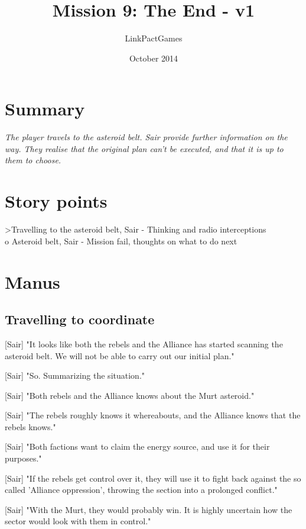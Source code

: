 \documentclass[a4paper,12pt]{article}
\begin{document}
\title{Mission 9: The End - v1}
\author{LinkPactGames}
\date{October 2014}
\maketitle

\section{Summary}

\textit{The player travels to the asteroid belt. Sair provide further information on the way.
They realise that the original plan can't be executed, and that it is up to them to choose.}

\section{Story points}

\textgreater Travelling to the asteroid belt, Sair - Thinking and radio interceptions\\
o Asteroid belt, Sair - Mission fail, thoughts on what to do next

\section{Manus}

\subsection{Travelling to coordinate}

[Sair] "It looks like both the rebels and the Alliance has started scanning the asteroid belt. We will not be
able to carry out our initial plan."

[Sair] "So. Summarizing the situation."

[Sair] "Both rebels and the Alliance knows about the Murt asteroid."

[Sair] "The rebels roughly knows it whereabouts, and the Alliance knows that the rebels knows."

[Sair] "Both factions want to claim the energy source, and use it for their purposes."

[Sair] "If the rebels get control over it, they will use it to fight back against the so called 'Alliance oppression',
throwing the section into a prolonged conflict."

[Sair] "With the Murt, they would probably win. It is highly uncertain how the sector would look with them in control."
\end{document}
